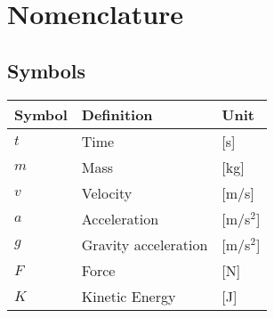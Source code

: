 \chapter*{Nomenclature}



\section*{Symbols}

\begin{longtable}{p{2.5cm}p{8cm}p{2.5cm}}
    \toprule
    Symbol & Definition & Unit \\
    \midrule\endhead %
    $t$ & Time & [s]\\
    $m$ & Mass & [kg] \\
    $v$ & Velocity & [m/s] \\
    $a$ & Acceleration & [m/s$^2$]\\
    $g$ & Gravity acceleration & [m/s$^2$]\\
    $F$ & Force & [N] \\
    $K$ & Kinetic Energy & [J] \\
    \bottomrule
\end{longtable}
